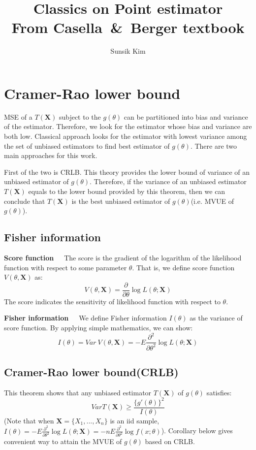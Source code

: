 \documentclass[10pt]{article}
\title{%
Classics on Point estimator \\
\large{From Casella\ \&\ Berger textbook}}
\author{Sunsik Kim}
\date{}
\begin{document}
\maketitle

\section{Cramer-Rao lower bound}
MSE of a $T(\textbf{X})$ subject to the $g(\theta)$ can be partitioned into bias and variance of the estimator. Therefore, we look for the estimator whose bias and variance are both low. Classical approach looks for the estimator with lowest variance among the set of unbiased estimators to find best estimator of $g(\theta)$. There are two main approaches for this work. 

\noindent First of the two is CRLB. This theory provides the lower bound of variance of an unbiased estimator of $g(\theta)$. Therefore, if the variance of an unbiased estimator $T(\textbf{X})$ equals to the lower bound provided  by this theorem, then we can conclude that $T(\textbf{X})$ is the best unbiased estimator of $g(\theta)$(i.e. MVUE of $g(\theta)$).

\subsection{Fisher information}
\textbf{Score function}\ \ \ The score is the gradient of the logarithm of the likelihood function with respect to some parameter $\theta$. That is, we define score function $V(\theta, \textbf{X})$ as:
$$
V(\theta, \textbf{X})=\displaystyle\frac{\partial}{\partial\theta}\log L(\theta;\textbf{X})
$$
The score indicates the sensitivity of likelihood function with respect to $\theta$.\bigskip

\noindent \textbf{Fisher information}\ \ \ We define Fisher information $I(\theta)$ as the variance of score function. By applying simple mathematics, we can show:
$$
I(\theta)=Var\ V(\theta, \textbf{X})=-E\displaystyle\frac{\partial^2}{\partial\theta^2}\log L(\theta;\textbf{X})
$$

\subsection{Cramer-Rao lower bound(CRLB)}
This theorem shows that any unbiased estimator $T(\textbf{X})$ of $g(\theta)$ satisfies:
$$
VarT(\textbf{X})\geq\frac{\{g'(\theta)\}^2}{I(\theta)}
$$
(Note that when $\textbf{X}=\{X_1,...,X_n\}$ is an iid sample, $I(\theta)=-E\displaystyle\frac{\partial^2}{\partial\theta^2}\log L(\theta;\textbf{X})=-nE\displaystyle\frac{\partial^2}{\partial\theta^2}\log f(x;\theta)
$). Corollary below gives convenient way to attain the MVUE of $g(\theta)$ based on CRLB.\bigskip
\end{document}
